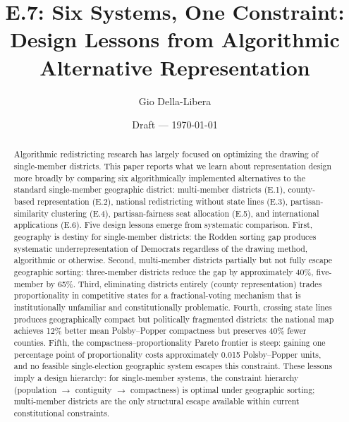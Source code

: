 \documentclass[12pt]{article}
\title{E.7: Six Systems, One Constraint:\\
       Design Lessons from Algorithmic Alternative Representation}
\author{Gio Della-Libera}
\date{Draft --- \today}
\begin{document}
\maketitle

\begin{abstract}
Algorithmic redistricting research has largely focused on optimizing the
drawing of single-member districts.  This paper reports what we learn
about representation design more broadly by comparing six algorithmically
implemented alternatives to the standard single-member geographic district:
multi-member districts (E.1), county-based representation (E.2), national
redistricting without state lines (E.3), partisan-similarity clustering
(E.4), partisan-fairness seat allocation (E.5), and international
applications (E.6).  Five design lessons emerge from systematic comparison.
First, geography is destiny for single-member districts: the Rodden sorting
gap produces systematic underrepresentation of Democrats regardless of the
drawing method, algorithmic or otherwise.  Second, multi-member districts
partially but not fully escape geographic sorting: three-member districts
reduce the gap by approximately 40\%, five-member by 65\%.  Third,
eliminating districts entirely (county representation) trades proportionality
in competitive states for a fractional-voting mechanism that is institutionally
unfamiliar and constitutionally problematic.  Fourth, crossing state lines
produces geographically compact but politically fragmented districts: the
national map achieves 12\% better mean Polsby--Popper compactness but
preserves 40\% fewer counties.  Fifth, the compactness--proportionality
Pareto frontier is steep: gaining one percentage point of proportionality
costs approximately 0.015 Polsby--Popper units, and no feasible
single-election geographic system escapes this constraint.  These lessons
imply a design hierarchy: for single-member systems, the constraint hierarchy
(population $\to$ contiguity $\to$ compactness) is optimal under geographic
sorting; multi-member districts are the only structural escape available
within current constitutional constraints.
\end{abstract}












\end{document}
